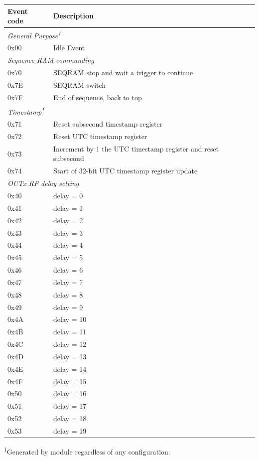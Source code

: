 \documentclass[openany]{article}
\begin{document}
	\begin{center}
	\begin{tabular}{|p{2cm} p{8cm}|}
	\multicolumn{1}{p{2cm}}{\bfseries Event code} & \multicolumn{1}{p{8cm}}{\bfseries Description} \\
	\hline
	\multicolumn{2}{p{10cm}}{\emph{General Purpose{\color{red}\textsuperscript{1}}}} \\ \hline
	0x00 & Idle Event \\ \hline
	\multicolumn{2}{p{10cm}}{\emph{Sequence RAM commanding}} \\ \hline
	0x70 & SEQRAM stop and wait a trigger to continue \\ \hline
	0x7E & SEQRAM switch \\ \hline
	0x7F & End of sequence, back to top \\ \hline
	\multicolumn{2}{p{10cm}}{\emph{Timestamp{\color{red}\textsuperscript{1}}}} \\ \hline
	0x71 & Reset subsecond timestamp register \\ \hline
	0x72 & Reset UTC timestamp register \\ \hline
	0x73 & Increment by 1 the UTC timestamp register and reset subsecond \\ \hline
	0x74 & Start of 32-bit UTC timestamp register update \\ \hline
	\multicolumn{2}{p{10cm}}{\emph{OUTx RF delay setting}} \\ \hline
	0x40 & delay = 0 \\ \hline
	0x41 & delay = 1 \\ \hline
	0x42 & delay = 2 \\ \hline
	0x43 & delay = 3 \\ \hline
	0x44 & delay = 4 \\ \hline
	0x45 & delay = 5 \\ \hline
	0x46 & delay = 6 \\ \hline
	0x47 & delay = 7 \\ \hline
	0x48 & delay = 8 \\ \hline
	0x49 & delay = 9 \\ \hline
	0x4A & delay = 10 \\ \hline
	0x4B & delay = 11 \\ \hline
	0x4C & delay = 12 \\ \hline
	0x4D & delay = 13 \\ \hline
	0x4E & delay = 14 \\ \hline
	0x4F & delay = 15 \\ \hline
	0x50 & delay = 16 \\ \hline
	0x51 & delay = 17 \\ \hline
	0x52 & delay = 18 \\ \hline
	0x53 & delay = 19 \\ \hline
	\end{tabular}
	\end{center}
	\par {\color{red} \textsuperscript{1}Generated by module regardless of any configuration.}
\end{document}
